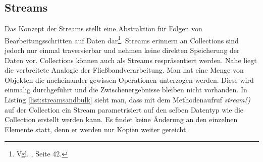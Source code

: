 \subsection{Streams}
Das Konzept der Streams stellt eine Abstraktion für Folgen von Bearbeitungsschritten auf Daten dar\footnote{Vgl. \cite{Inden.2015}, Seite 42.}. Streams erinnern an Collections sind jedoch nur einmal traversierbar und nehmen keine direkten Speicherung der Daten vor. Collections können auch als Streams respräsentiert werden. Nahe liegt die verbreitete Analogie der Fließbandverarbeitung. Man hat eine Menge von Objekten die nacheinander gewissen Operationen unterzogen werden. Diese wird einmalig durchgeführt und die Zwischenergebnisse bleiben nicht vorhanden. In Listing \ref{list:streamsandbulk} sieht man, dass mit dem Methodenaufruf \textit{stream()} auf der Collection ein Stream parametrisiert auf den selben Datentyp wie die Collection erstellt werden kann. Es findet keine Änderung an den einzelnen Elemente statt, denn er werden nur Kopien weiter gereicht.

